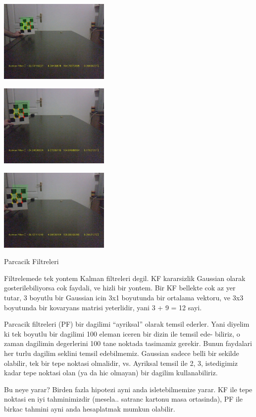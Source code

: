 \documentclass[12pt,fleqn]{article}
\begin{document}
\includegraphics[height=4cm]{cb-kf-2.jpg}

\includegraphics[height=4cm]{cb-kf-3.jpg}

\includegraphics[height=4cm]{cb-kf-4.jpg}

Parcacik Filtreleri

Filtrelemede tek yontem Kalman filtreleri degil. KF kararsizlik Gaussian
olarak gosterilebiliyorsa cok faydali, ve hizli bir yontem. Bir KF bellekte
cok az yer tutar, 3 boyutlu bir Gaussian icin 3x1 boyutunda bir ortalama
vektoru, ve 3x3 boyutunda bir kovaryans matrisi yeterlidir, yani 3 + 9 = 12
sayi.

Parcacik filtreleri (PF) bir dagilimi ``ayriksal'' olarak temsil
ederler. Yani diyelim ki tek boyutlu bir dagilimi 100 eleman iceren bir
dizin ile temsil ede- biliriz, o zaman dagilimin degerlerini 100 tane
noktada tasimamiz gerekir.  Bunun faydalari her turlu dagilim seklini
temsil edebilmemiz. Gaussian sadece belli bir sekilde olabilir, tek bir
tepe noktasi olmalidir, vs. Ayriksal temsil ile 2, 3, istedigimiz kadar
tepe noktasi olan (ya da hic olmayan) bir dagilim kullanabiliriz.

Bu neye yarar? Birden fazla hipotezi ayni anda isletebilmemize yarar. KF
ile tepe noktasi en iyi tahminimizdir (mesela.. satranc kartonu masa
ortasinda), PF ile birkac tahmini ayni anda hesaplatmak mumkun olabilir.
\end{document}
